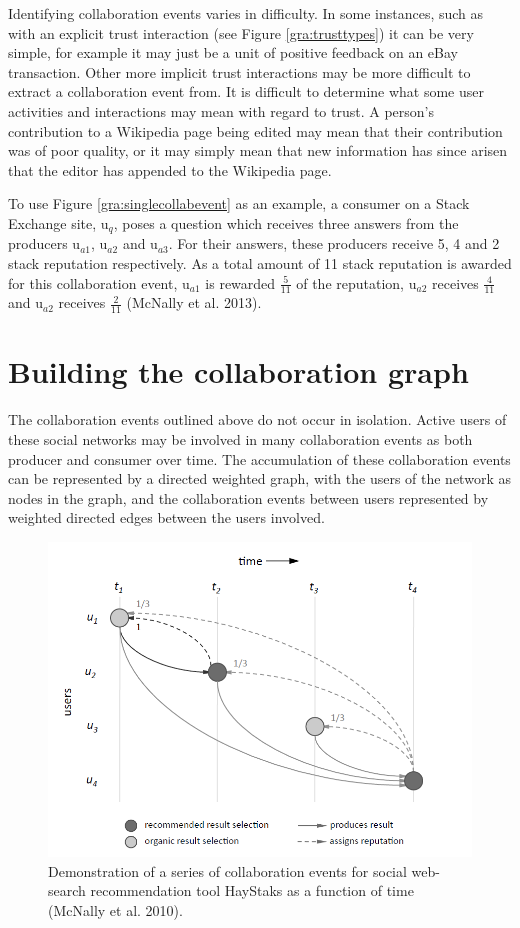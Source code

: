 \documentclass[]{final_report}
\begin{document}
Identifying collaboration events varies in difficulty. In some instances, such as with an explicit trust interaction (see Figure \ref{gra:trusttypes}) it can be very simple, for example it may just be a unit of positive feedback on an eBay transaction. Other more implicit trust interactions may be more difficult to extract a collaboration event from. It is difficult to determine what some user activities and interactions may mean with regard to trust. A person's contribution to a Wikipedia page being edited may mean that their contribution was of poor quality, or it may simply mean that new information has since arisen that the editor has appended to the Wikipedia page.

To use Figure \ref{gra:singlecollabevent} as an example, a consumer on a Stack Exchange site, u$_{q}$, poses a question which receives three answers from the producers u$_{a1}$, u$_{a2}$ and u$_{a3}$. For their answers, these producers receive 5, 4 and 2 stack reputation respectively. As a total amount of 11 stack reputation is awarded for this collaboration event, u$_{a1}$ is rewarded $\frac{5}{11}$ of the reputation, u$_{a2}$ receives $\frac{4}{11}$ and u$_{a2}$ receives $\frac{2}{11}$ (McNally et al. 2013).

\section{Building the collaboration graph}

The collaboration events outlined above do not occur in isolation. Active users of these social networks may be involved in many collaboration events as both producer and consumer over time. The accumulation of these collaboration events can be represented by a directed weighted graph, with the users of the network as nodes in the graph, and the collaboration events between users represented by weighted directed edges between the users involved.

\begin{figure}[ht!]
\centering
\includegraphics[width=130mm]{chap3/collabeventstime.PNG}
\caption{Demonstration of a series of collaboration events for social web-search recommendation tool HayStaks as a function of time (McNally et al. 2010).}
\end{figure}\label{gra:collabtime}
\end{document}
